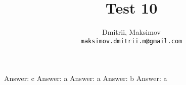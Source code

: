 \documentclass{homework}
\title{Test 10}
\author{
  Dmitrii, Maksimov\\
  \texttt{maksimov.dmitrii.m@gmail.com}
}
\begin{document}
\maketitle

\exercise*
Answer: c
\exercise*
Answer: a
\exercise*
Answer: a
\exercise*
Answer: b
\exercise*
Answer: a
\end{document}
